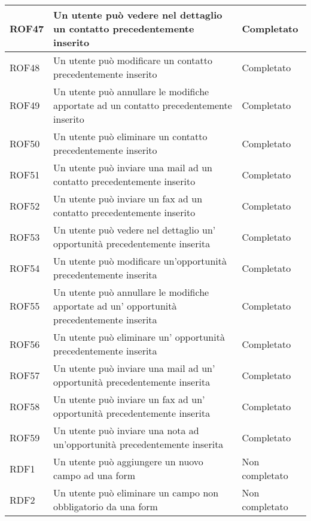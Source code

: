 \begin{longtable}[h]{|p{2.5cm}|p{8cm}|p{2.5cm}|}
	ROF47&Un utente può vedere nel dettaglio un contatto precedentemente inserito&Completato\\
	\hline
	\rule[-3mm]{0mm}{0.8cm}
	ROF48&Un utente può modificare un contatto precedentemente inserito&Completato\\
	\hline
	\rule[-3mm]{0mm}{0.8cm}
	ROF49&Un utente può annullare le modifiche apportate ad un contatto precedentemente inserito&Completato\\
	\hline
	\rule[-3mm]{0mm}{0.8cm}
	ROF50&Un utente può eliminare un contatto precedentemente inserito&Completato\\
	\hline
	\rule[-3mm]{0mm}{0.8cm}
	ROF51&Un utente può inviare una mail ad un contatto precedentemente inserito&Completato \\
	\hline
	\rule[-3mm]{0mm}{0.8cm}
	ROF52&Un utente può inviare un fax ad un contatto precedentemente inserito&Completato \\
	\hline
	\rule[-3mm]{0mm}{0.8cm}
	ROF53&Un utente può vedere nel dettaglio un' opportunità precedentemente inserita&Completato\\
	\hline
	ROF54&Un utente può modificare un'opportunità precedentemente inserita&Completato\\
	\hline
	\rule[-3mm]{0mm}{0.8cm}
	ROF55&Un utente può annullare le modifiche apportate ad un' opportunità precedentemente inserita&Completato\\
	\hline
	\rule[-3mm]{0mm}{0.8cm}
	ROF56&Un utente può eliminare un' opportunità precedentemente inserita&Completato\\
	\hline
	\rule[-3mm]{0mm}{0.8cm}
	ROF57&Un utente può inviare una mail ad un' opportunità precedentemente inserita&Completato \\
	\hline
	\rule[-3mm]{0mm}{0.8cm}
	ROF58&Un utente può inviare un fax ad un' opportunità precedentemente inserita&Completato \\
	\hline
	\rule[-3mm]{0mm}{0.8cm}
	ROF59&Un utente può inviare una nota ad un'opportunità precedentemente inserita& Completato\\
	\hline
	\rule[-3mm]{0mm}{0.8cm}
	RDF1&Un utente può aggiungere un nuovo campo ad una form&Non completato\\
	\hline
	\rule[-3mm]{0mm}{0.8cm}
	RDF2&Un utente può eliminare un campo non obbligatorio da una form& Non completato \\
	\hline
\end{longtable}

